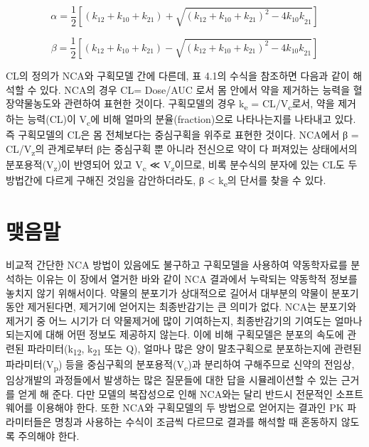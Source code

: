 \documentclass[
  11pt,
  krantz2, a4paper, twoside]{krantz}
\theoremstyle{definition}
\theoremstyle{definition}
\theoremstyle{definition}
\theoremstyle{definition}
\theoremstyle{remark}
\begin{document}
\begin{equation}
\alpha = \frac{1}{2}\left\lbrack \left( k_{12} + k_{10} + k_{21} \right) + \sqrt{\left( k_{12} + k_{10} + k_{21} \right)^{2} - 4{k_{10}k}_{21}} \right\rbrack
\label{eq:eq4-6}
\end{equation}

\begin{equation}
\beta = \frac{1}{2}\left\lbrack \left( k_{12} + k_{10} + k_{21} \right) - \sqrt{\left( k_{12} + k_{10} + k_{21} \right)^{2} - 4{k_{10}k}_{21}} \right\rbrack
\label{eq:eq4-7}
\end{equation}

CL의 정의가 NCA와 구획모델 간에 다른데, 표 4.1의 수식을 참조하면 다음과
같이 해석할 수 있다. NCA의 경우 CL= Dose/AUC 로서 몸 안에서 약을
제거하는 능력을 혈장약물농도와 관련하여 표현한 것이다. 구획모델의 경우
k\textsubscript{e} = CL/V\textsubscript{c}로서, 약을 제거하는 능력(CL)이 V\textsubscript{c}에 비해 얼마의
분율(fraction)으로 나타나는지를 나타내고 있다. 즉 구획모델의 CL은 몸
전체보다는 중심구획을 위주로 표현한 것이다. NCA에서 β = CL/V\textsubscript{z}의
관계로부터 β는 중심구획 뿐 아니라 전신으로 약이 다 퍼져있는 상태에서의
분포용적(V\textsubscript{z})이 반영되어 있고 V\textsubscript{c} ≪ V\textsubscript{z}이므로, 비록 분수식의 분자에
있는 CL도 두 방법간에 다르게 구해진 것임을 감안하더라도, β \textless{} k\textsubscript{e}의 단서를 찾을 수 있다.

\section{맺음말}\label{uxb9fauxc74cuxb9d0-3}

비교적 간단한 NCA 방법이 있음에도 불구하고 구획모델을 사용하여
약동학자료를 분석하는 이유는 이 장에서 열거한 바와 같이 NCA 결과에서 누락되는 약동학적 정보를 놓치지 않기 위해서이다.
약물의 분포기가 상대적으로 길어서 대부분의 약물이 분포기동안 제거된다면, 제거기에 얻어지는 최종반감기는 큰 의미가 없다. 
NCA는 분포기와 제거기 중 어느 시기가 더 약물제거에 많이 기여하는지, 최종반감기의 기여도는 얼마나 되는지에 대해
어떤 정보도 제공하지 않는다.
이에 비해 구획모델은 분포의 속도에 관련된 파라미터(k\textsubscript{12}, k\textsubscript{21} 또는 Q), 얼마나 많은 양이 말초구획으로
분포하는지에 관련된 파라미터(V\textsubscript{p}) 등을 중심구획의 분포용적(V\textsubscript{c})과 분리하여
구해주므로 신약의 전임상, 임상개발의 과정들에서 발생하는 많은 질문들에
대한 답을 시뮬레이션할 수 있는 근거를 얻게 해 준다. 다만 모델의
복잡성으로 인해 NCA와는 달리 반드시 전문적인 소프트웨어를 이용해야 한다.
또한 NCA와 구획모델의 두 방법으로 얻어지는 결과인 PK 파라미터들은 명칭과 사용하는 수식이 조금씩 다르므로 결과를 해석할 때 혼동하지 않도록 주의해야 한다.
\end{document}
